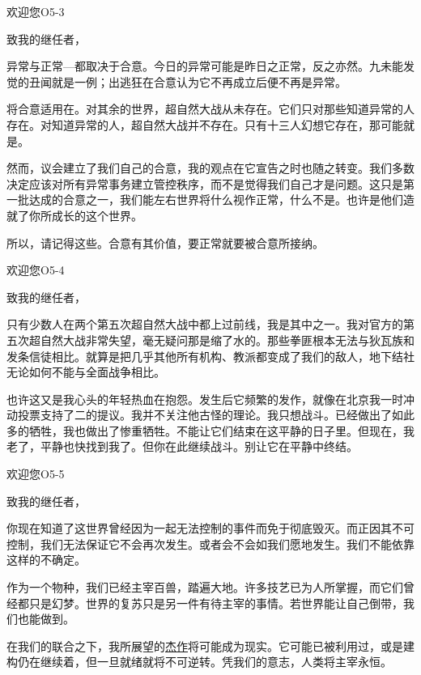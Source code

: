 \begin{scpbox}

欢迎您O5-3

致我的继任者，

异常与正常—都取决于合意。今日的异常可能是昨日之正常，反之亦然。九未能发觉的丑闻就是一例；出逃狂在合意认为它不再成立后便不再是异常。

将合意适用在。对其余的世界，超自然大战从未存在。它们只对那些知道异常的人存在。对知道异常的人，超自然大战并不存在。只有十三人幻想它存在，那可能就是。

然而，议会建立了我们自己的合意，我的观点在它宣告之时也随之转变。我们多数决定应该对所有异常事务建立管控秩序，而不是觉得我们自己才是问题。这只是第一批达成的合意之一，我们能左右世界将什么视作正常，什么不是。也许是他们造就了你所成长的这个世界。

所以，请记得这些。合意有其价值，要正常就要被合意所接纳。

\end{scpbox}

\begin{scpbox}

欢迎您O5-4

致我的继任者，

只有少数人在两个第五次超自然大战中都上过前线，我是其中之一。我对官方的第五次超自然大战非常失望，毫无疑问那是缩了水的。那些拳匪根本无法与狄瓦族和发条信徒相比。就算是把几乎其他所有机构、教派都变成了我们的敌人，地下结社无论如何不能与全面战争相比。

也许这又是我心头的年轻热血在抱怨。发生后它频繁的发作，就像在北京我一时冲动投票支持了二的提议。我并不关注他古怪的理论。我只想战斗。已经做出了如此多的牺牲，我也做出了惨重牺牲。不能让它们结束在这平静的日子里。但现在，我老了，平静也快找到我了。但你在此继续战斗。别让它在平静中终结。

\end{scpbox}

\begin{scpbox}

欢迎您O5-5

致我的继任者，

你现在知道了这世界曾经因为一起无法控制的事件而免于彻底毁灭。而正因其不可控制，我们无法保证它不会再次发生。或者会不会如我们愿地发生。我们不能依靠这样的不确定。

作为一个物种，我们已经主宰百兽，踏遍大地。许多技艺已为人所掌握，而它们曾经都只是幻梦。世界的复苏只是另一件有待主宰的事情。若世界能让自己倒带，我们也能做到。

在我们的联合之下，我所展望的\hyperref[chap:SCP-2000]{杰作}将可能成为现实。它可能已被利用过，或是建构仍在继续着，但一旦就绪就将不可逆转。凭我们的意志，人类将主宰永恒。

\end{scpbox}


